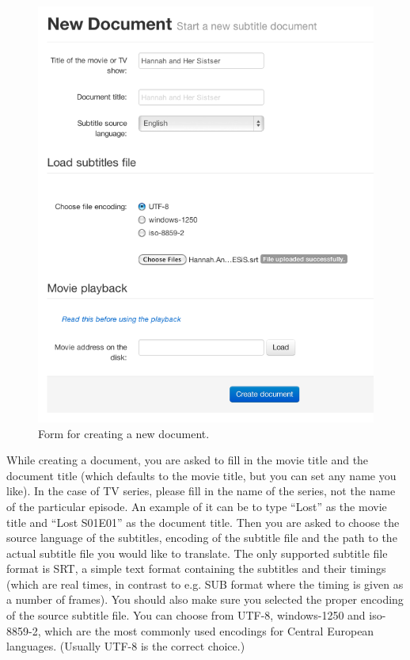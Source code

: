 \begin{figure}[h]
\begin{center}
\includegraphics[scale=0.4]{figures/user_manual/new_document.png}
\end{center}
\caption{Form for creating a new document.}
\end{figure}

While creating a document, you are asked to fill in the movie title and the document title (which defaults to the movie title, but you can set any name you like). In the case of TV series, please fill in the name of the series, not the name of the particular episode. An example of it can be to type ``Lost'' as the movie title and ``Lost S01E01'' as the document title. Then you are asked to choose the source language of the subtitles, encoding of the subtitle file and the path to the actual subtitle file you would like to translate. The only supported subtitle file format is SRT, a simple text format containing the subtitles and their timings (which are real times, in contrast to e.g. SUB format where the timing is given as a number of frames). You should also make sure you selected the proper encoding of the source subtitle file. You can choose from UTF-8, windows-1250 and iso-8859-2, which are the most commonly used encodings for Central European languages. (Usually UTF-8 is the correct choice.)

